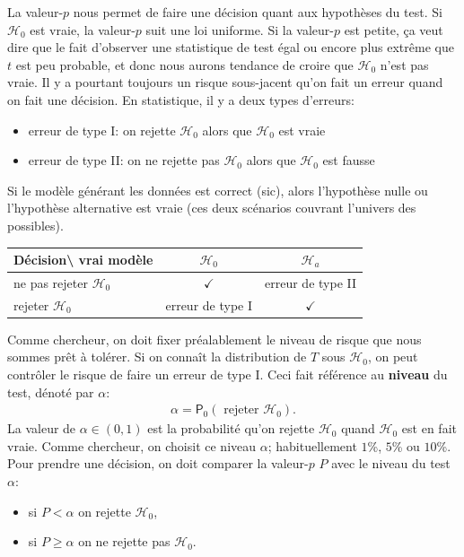 \documentclass[
  11pt,
  letterpaper,
]{book}
\providecommand{\tightlist}{%
  \setlength{\itemsep}{0pt}\setlength{\parskip}{0pt}}
\begin{document}
La valeur-\(p\) nous permet de faire une décision quant aux hypothèses du test. Si \(\mathscr{H}_0\) est vraie, la valeur-\(p\) suit une loi uniforme. Si la valeur-\(p\) est petite, ça veut dire que le fait d'observer une statistique de test égal ou encore plus extrême que \(t\) est peu probable, et donc nous aurons tendance de croire que \(\mathscr{H}_0\) n'est pas vraie. Il y a pourtant toujours un risque sous-jacent qu'on fait un erreur quand on fait une décision. En statistique, il y a deux types d'erreurs:

\begin{itemize}
\tightlist
\item
  erreur de type I: on rejette \(\mathscr{H}_0\) alors que \(\mathscr{H}_0\) est vraie
\item
  erreur de type II: on ne rejette pas \(\mathscr{H}_0\) alors que \(\mathscr{H}_0\) est fausse
\end{itemize}

Si le modèle générant les données est correct (sic), alors l'hypothèse nulle ou l'hypothèse alternative est vraie (ces deux scénarios couvrant l'univers des possibles).

\begin{longtable}[]{@{}lcc@{}}
\toprule
Décision\textbackslash{} vrai modèle & \(\mathscr{H}_0\) & \(\mathscr{H}_a\)\tabularnewline
\midrule
\endhead
ne pas rejeter \(\mathscr{H}_0\) & \(\checkmark\) & erreur de type II\tabularnewline
rejeter \(\mathscr{H}_0\) & erreur de type I & \(\checkmark\)\tabularnewline
\bottomrule
\end{longtable}

Comme chercheur, on doit fixer préalablement le niveau de risque que nous sommes prêt à tolérer. Si on connaît la distribution de \(T\) sous \(\mathscr{H}_0\), on peut contrôler le risque de faire un erreur de type I. Ceci fait référence au \textbf{niveau} du test, dénoté par \(\alpha\):
\begin{align*}
\alpha = \mathsf{P}_0\left(\text{ rejeter } \mathscr{H}_0\right).
\end{align*}
La valeur de \(\alpha \in (0, 1)\) est la probabilité qu'on rejette \(\mathscr{H}_0\) quand \(\mathscr{H}_0\) est en fait vraie. Comme chercheur, on choisit ce niveau \(\alpha\); habituellement \(1\)\%, \(5\)\% ou \(10\)\%. Pour prendre une décision, on doit comparer la valeur-\(p\) \(P\) avec le niveau du test \(\alpha\):

\begin{itemize}
\tightlist
\item
  si \(P < \alpha\) on rejette \(\mathscr{H}_0\),
\item
  si \(P \geq \alpha\) on ne rejette pas \(\mathscr{H}_0\).
\end{itemize}
\end{document}
